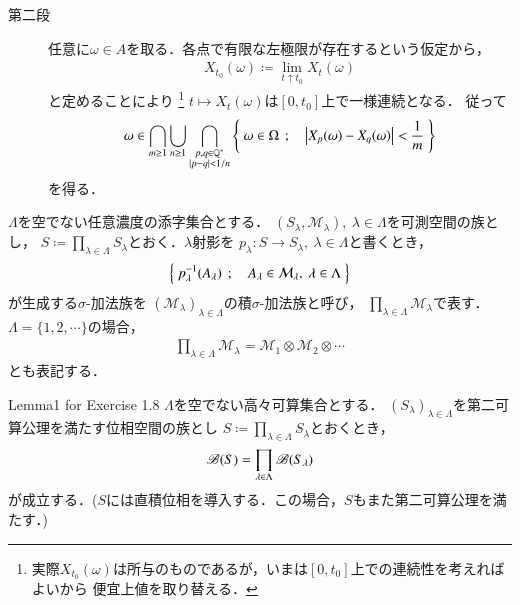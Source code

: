 \begin{prf}
\begin{description}
		\item[第二段]
			任意に$\omega \in A$を取る．各点で有限な左極限が存在するという仮定から，
			\begin{align}
				X_{t_0}(\omega) \coloneqq \lim_{t \uparrow t_0}X_t(\omega)
			\end{align}
			と定めることにより
			\footnote{
				実際$X_{t_0}(\omega)$は所与のものであるが，いまは$[0,t_0]$上での連続性を考えればよいから
				便宜上値を取り替える．
			}
			$t \longmapsto X_t(\omega)$は$[0,t_0]$上で一様連続となる．
			従って
			\begin{align}
				\omega \in \bigcap_{m \geq 1} \bigcup_{n \geq 1} \bigcap_{\substack{p,q \in \mathbb{Q}^* \\ |p-q| < 1/n}}
		\left\{\ \omega \in \Omega\ \, ; \quad \left|X_p(\omega) - X_q(\omega) \right| < \frac{1}{m}\ \right\}
			\end{align}
			を得る．
			\QED
	\end{description}
\end{prf}

\begin{screen}
	\begin{dfn}
		$\Lambda$を空でない任意濃度の添字集合とする．
		$(S_\lambda,\mathcal{M}_\lambda),\ \lambda \in \Lambda$を可測空間の族とし，
		$S \coloneqq \prod_{\lambda \in \Lambda} S_\lambda$とおく．$\lambda$射影を
		$p_\lambda:S \longrightarrow S_\lambda,\ \lambda \in \Lambda$と書くとき，
		\begin{align}
			\left\{\ p_\lambda^{-1}(A_\lambda)\ \, ; \quad A_\lambda \in \mathcal{M}_\lambda,\ \lambda \in \Lambda\ \right\}
		\end{align}
		が生成する$\sigma$-加法族を
		$(\mathcal{M}_\lambda)_{\lambda \in \Lambda}$の積$\sigma$-加法族と呼び，
		$\prod_{\lambda \in \Lambda} \mathcal{M}_\lambda$で表す．
		$\Lambda = \{1,2,\cdots\}$の場合，
		\begin{align}
			\prod_{\lambda \in \Lambda} \mathcal{M}_\lambda
			= \mathcal{M}_1 \otimes \mathcal{M}_2 \otimes \cdots
		\end{align}
		とも表記する．
	\end{dfn}
\end{screen}
\begin{itembox}[l]{Lemma1 for Exercise 1.8}
	$\Lambda$を空でない高々可算集合とする．
	$(S_\lambda)_{\lambda \in \Lambda}$を第二可算公理を満たす位相空間の族とし
	$S \coloneqq \prod_{\lambda \in \Lambda} S_\lambda$とおくとき，
	\begin{align}
		\mathscr{B}(S) = \prod_{\lambda \in \Lambda} \mathscr{B}(S_\lambda)
		\label{eq:lem1_for_chap_1_exercise_1_8_1}
	\end{align}
	が成立する．($S$には直積位相を導入する．この場合，$S$もまた第二可算公理を満たす．)
\end{itembox}

